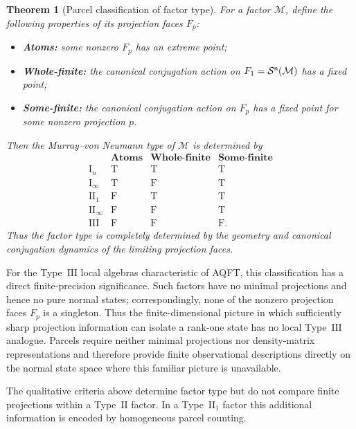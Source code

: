 \documentclass[11pt]{article}
\newtheorem{theorem}{Theorem}[section]
\begin{document}
\begin{theorem}[Parcel classification of factor type]
\label{thm:classification}
For a factor $\mathcal M$, define the following properties of its
projection faces $F_p$:
\begin{itemize}
\item \textbf{Atoms:} some nonzero $F_p$ has an extreme point;
\item \textbf{Whole-finite:} the canonical conjugation action on
$F_1=\mathcal S^{\sf n}(\mathcal M)$ has a fixed point;
\item \textbf{Some-finite:} the canonical conjugation action on $F_p$
has a fixed point for some nonzero projection $p$.
\end{itemize}
Then the Murray--von Neumann type of $\mathcal M$ is determined by
\[
\begin{array}{lccc}
 & \textbf{Atoms} & \textbf{Whole-finite} & \textbf{Some-finite}\\
\hline
\mathrm I_n        & \mathrm T & \mathrm T & \mathrm T\\
\mathrm I_\infty   & \mathrm T & \mathrm F & \mathrm T\\
\mathrm{II}_1      & \mathrm F & \mathrm T & \mathrm T\\
\mathrm{II}_\infty & \mathrm F & \mathrm F & \mathrm T\\
\mathrm{III}       & \mathrm F & \mathrm F & \mathrm F .
\end{array}
\]
Thus the factor type is completely determined by the geometry and
canonical conjugation dynamics of the limiting projection faces.
\end{theorem}
For the Type~$\mathrm{III}$ local algebras characteristic of AQFT, this
classification has a direct finite-precision significance. Such factors
have no minimal projections and hence no pure normal states;
correspondingly, none of the nonzero projection faces $F_p$ is a
singleton. Thus the finite-dimensional picture in which sufficiently
sharp projection information can isolate a rank-one state has no local
Type~$\mathrm{III}$ analogue. Parcels require neither minimal projections
nor density-matrix representations and therefore provide finite
observational descriptions directly on the normal state space where this
familiar picture is unavailable.

The qualitative criteria above determine factor type but do not compare
finite projections within a Type~$\mathrm{II}$ factor. In a
Type~$\mathrm{II}_1$ factor this additional information is encoded by
homogeneous parcel counting.
\end{document}
